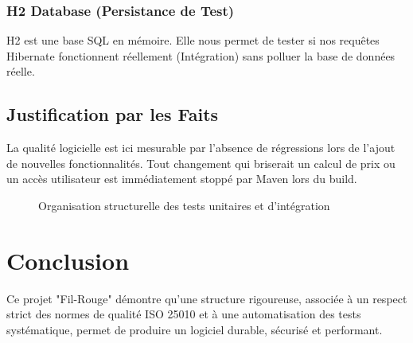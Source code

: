 \documentclass[12pt,a4paper]{report}
\begin{document}
\subsection{H2 Database (Persistance de Test)}
H2 est une base SQL en mémoire. Elle nous permet de tester si nos requêtes Hibernate fonctionnent réellement (Intégration) sans polluer la base de données réelle.

\section{Justification par les Faits}
La qualité logicielle est ici mesurable par l'absence de régressions lors de l'ajout de nouvelles fonctionnalités. Tout changement qui briserait un calcul de prix ou un accès utilisateur est immédiatement stoppé par Maven lors du build.

\begin{figure}[h]
    \centering
    \caption{Organisation structurelle des tests unitaires et d'intégration}
\end{figure}

\chapter*{Conclusion}
Ce projet "Fil-Rouge" démontre qu'une structure rigoureuse, associée à un respect strict des normes de qualité ISO 25010 et à une automatisation des tests systématique, permet de produire un logiciel durable, sécurisé et performant.
\end{document}
